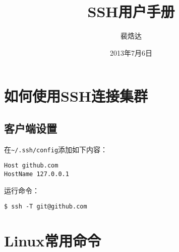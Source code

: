 \documentclass[cs4size, a4paper, openany]{hpcmanual}
\title{SSH用户手册}
\author{裴焅达}
\date{2013年7月6日}
\begin{document}
\maketitle

\section{如何使用SSH连接集群}

\subsection{客户端设置}

在\texttt{\textasciitilde{}/.ssh/config}添加如下内容：

\begin{verbatim}
Host github.com
HostName 127.0.0.1
\end{verbatim}

运行命令：

\begin{verbatim}
$ ssh -T git@github.com
\end{verbatim}

\section{Linux常用命令}
\end{document}
